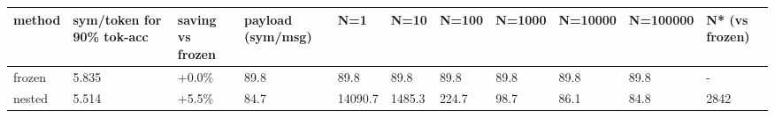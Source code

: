 \begin{tabular}{lllllllllll}
\hline
method & sym/token for 90\% tok-acc & saving vs frozen & payload (sym/msg) & N=1 & N=10 & N=100 & N=1000 & N=10000 & N=100000 & N* (vs frozen) \\
\hline
frozen & 5.835 & +0.0\% & 89.8 & 89.8 & 89.8 & 89.8 & 89.8 & 89.8 & 89.8 & - \\
nested & 5.514 & +5.5\% & 84.7 & 14090.7 & 1485.3 & 224.7 & 98.7 & 86.1 & 84.8 & 2842 \\
\hline
\end{tabular}

